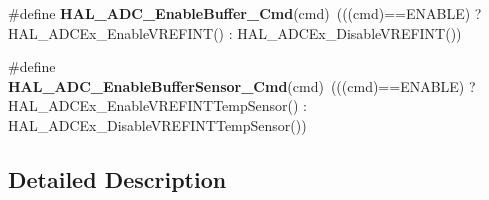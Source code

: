 \begin{DoxyCompactItemize}
\#define {\bfseries H\+A\+L\+\_\+\+A\+D\+C\+\_\+\+Enable\+Buffer\+\_\+\+Cmd}(cmd)~(((cmd)==E\+N\+A\+B\+LE) ? H\+A\+L\+\_\+\+A\+D\+C\+Ex\+\_\+\+Enable\+V\+R\+E\+F\+I\+NT() \+: H\+A\+L\+\_\+\+A\+D\+C\+Ex\+\_\+\+Disable\+V\+R\+E\+F\+I\+NT())
\item 
\mbox{\label{group___h_a_l___aliased___functions_ga674bce235a7be59ff19cca605b2e3ce8}} 
\#define {\bfseries H\+A\+L\+\_\+\+A\+D\+C\+\_\+\+Enable\+Buffer\+Sensor\+\_\+\+Cmd}(cmd)~(((cmd)==E\+N\+A\+B\+LE) ?  H\+A\+L\+\_\+\+A\+D\+C\+Ex\+\_\+\+Enable\+V\+R\+E\+F\+I\+N\+T\+Temp\+Sensor() \+: H\+A\+L\+\_\+\+A\+D\+C\+Ex\+\_\+\+Disable\+V\+R\+E\+F\+I\+N\+T\+Temp\+Sensor())
\end{DoxyCompactItemize}


\subsection{Detailed Description}
